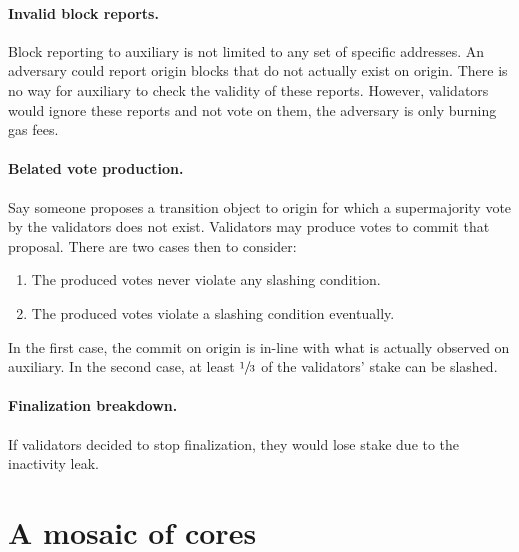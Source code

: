 \documentclass[12pt,a4paper]{article}
\begin{document}
\paragraph{Invalid block reports.}
Block reporting to auxiliary is not limited to any set of specific addresses.
An adversary could report origin blocks that do not actually exist on origin.
There is no way for auxiliary to check the validity of these reports.
However, validators would ignore these reports and not vote on them, the adversary is only burning gas fees.

\paragraph{Belated vote production.}
Say someone proposes a transition object to origin for which a supermajority vote by the validators does not exist.
Validators may produce votes to commit that proposal.
There are two cases then to consider:

\begin{enumerate}
    \item The produced votes never violate any slashing condition.
    \item The produced votes violate a slashing condition eventually.
\end{enumerate}

In the first case, the commit on origin is in-line with what is actually observed on auxiliary.
In the second case, at least $\sfrac{1}{3}$ of the validators' stake can be slashed.

\paragraph{Finalization breakdown.}
If validators decided to stop finalization, they would lose stake due to the inactivity leak.


%
%
\section{A mosaic of cores}
\end{document}
